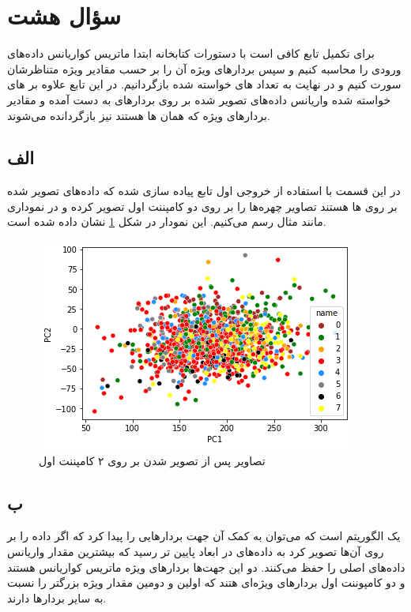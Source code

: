 \documentclass[12pt,onecolumn,a4paper]{article}
\begin{document}
\newpage
\section*{سؤال هشت}
برای تکمیل تابع  کافی است با دستورات کتابخانه  ابتدا ماتریس کواریانس داده‌های ورودی را محاسبه کنیم و سپس بردارهای ویژه آن را بر حسب مقادیر ویژه متناظرشان سورت کنیم و در نهایت به تعداد های خواسته شده  بازگردانیم. در این تابع علاوه بر های خواسته شده واریانس داده‌های تصویر شده بر روی بردارهای به دست آمده و مقادیر بردارهای ویژه که همان ها هستند نیز بازگردانده می‌شوند.
\subsection*{الف}
در این قسمت با استفاده از خروجی اول تابع پیاده سازی شده که داده‌های تصویر شده بر روی ها هستند تصاویر چهره‌ها را بر روی دو کامپننت اول تصویر کرده و در نموداری مانند مثال رسم می‌کنیم. این نمودار در شکل \ref{fig:4} نشان داده شده است.
\begin{figure}[h!]
    \begin{center}
    \includegraphics[scale=0.55]{plots/q8_a.png}
    \caption{تصاویر پس از تصویر شدن بر روی ۲ کامپننت اول }
    \label{fig:4}
    \end{center}
\end{figure}

\subsection*{ب}
 یک الگوریتم  است که می‌توان به کمک آن جهت بردارهایی را پیدا کرد که اگر داده را بر روی آن‌ها تصویر کرد به داده‌های در ابعاد پایین تر رسید که بیشترین مقدار واریانس داده‌های اصلی را حفظ می‌کنند. دو این جهت‌ها بردارهای ویژه ماتریس کواریانس هستند و دو کامپوننت اول بردارهای ویژه‌ای هتند که اولین و دومین مقدار ویژه بزرگتر را نسبت به سایر بردارها دارند.
\end{document}
